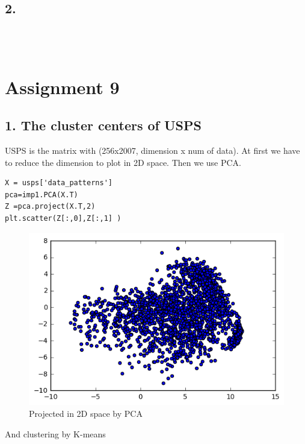 \documentclass[a4paper,11pt]{article}
\begin{document}
\subsection*{2.}

\begin{verbatim}



\end{verbatim}


\section*{Assignment 9}

\subsection*{1. The cluster centers of USPS}

USPS is the matrix with (256x2007, dimension x num of data). At first we have to reduce the dimension to plot in 2D space. Then we use PCA.

\begin{verbatim}
X = usps['data_patterns']
pca=imp1.PCA(X.T)
Z =pca.project(X.T,2)
plt.scatter(Z[:,0],Z[:,1] )
\end{verbatim}

\begin{figure}[htbp]
  \includegraphics[scale=0.6]{pca.png}
  \caption{Projected in 2D space by PCA}
\end{figure}

And clustering by K-means
\end{document}
